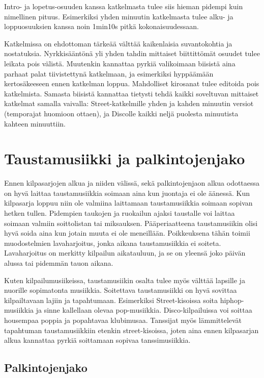 \documentclass[12pt, a4paper, oneside]{article}
\begin{document}
Intro- ja lopetus-osuuden kanssa katkelmasta tulee siis hieman pidempi kuin nimellinen pituus.
Esimerkiksi yhden minuutin katkelmasta tulee alku- ja loppuosuuksien kanssa noin 1min10s pitkä kokonaisuudessaan.

Katkelmissa on ehdottoman tärkeää välttää kaikenlaisia suvantokohtia ja nostatuksia.
Nyrkkisääntönä yli yhden tahdin mittaiset biittittömät osuudet tulee leikata pois välistä.
Muutenkin kannattaa pyrkiä valikoimaan biisistä aina parhaat palat tiivistettynä katkelmaan,
ja esimerkiksi hyppäämään kertosäkeeseen ennen katkelman loppua.
Mahdolliset kirosanat tulee editoida pois katkelmista.
Samasta biisistä kannattaa tietysti tehdä kaikki soveltuvan mittaiset katkelmat samalla vaivalla: Street-katkelmille yhden ja kahden minuutin versiot (temporajat huomioon ottaen),
ja Discolle kaikki neljä puolesta minuutista kahteen minuuttiin.

\clearpage

\section{Taustamusiikki ja palkintojenjako} \label{sec:taustamusiikki}

Ennen kilpasarjojen alkua ja niiden välissä,
sekä palkintojenjaon alkua odottaessa on hyvä laittaa taustamusiikkia soimaan aina kun juontaja ei ole äänessä.
Kun kilpasarja loppuu niin ole valmiina laittamaan taustamusiikkia soimaan sopivan hetken tullen.
Pidempien taukojen ja ruokailun ajaksi taustalle voi laittaa soimaan valmiin soittolistan tai miksauksen.
Pääperiaatteena taustamusiikin olisi hyvä soida aina kun jotain muuta ei ole meneillään.
Poikkeuksena tähän toimii muodostelmien lavaharjoitus,
jonka aikana taustamusiikkia ei soiteta.
Lavaharjoitus on merkitty kilpailun aikatauluun,
ja se on yleensä joko päivän alussa tai pidemmän tauon aikana.

Kuten kilpailumusiikeissa,
taustamusiikin osalta tulee myös välttää lapsille ja nuorille sopimatonta musiikkia.
Soitettava taustamusiikki on hyvä sovittaa kilpailtavaan lajiin ja tapahtumaan.
Esimerkiksi Street-kisoissa soita hiphop-musiikkia ja sinne kallellaan olevaa pop-musiikkia.
Disco-kilpailuissa voi soittaa housempaa poppia ja popahtavaa klubimusaa.
Tanssijat myös lämmittelevät tapahtuman taustamusiikkiin etenkin street-kisoissa,
joten aina ennen kilpasarjan alkua kannattaa pyrkiä soittamaan sopivaa tanssimusiikkia.

\subsection{Palkintojenjako} \label{subsec:palkintojenjako}
\end{document}
